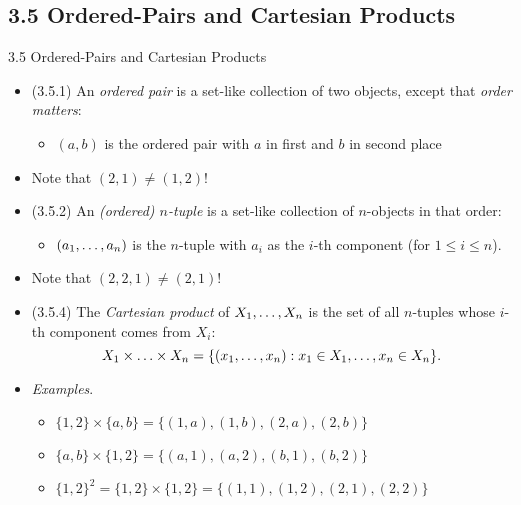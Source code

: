 \subsection{3.5 Ordered-Pairs and Cartesian Products}
\begin{frame}{3.5 Ordered-Pairs and Cartesian Products}

	\begin{itemize}
	
		\item (3.5.1) An \emph{ordered pair} is a set-like collection of two objects, except that \emph{order matters}:
		
			\begin{itemize}
			
				\item $(a,b)$ is the ordered pair with $a$ in first and $b$ in second place
			
			\end{itemize}
			
		\item Note that $(2,1)\neq (1,2)$!
			
		\item (3.5.2) An \emph{(ordered) $n$-tuple} is a set-like collection of $n$-objects in that order:
		
		\begin{itemize}
		
			\item $(a_1, \mathellipsis, a_n)$ is the $n$-tuple with $a_i$ as the $i$-th component (for $1\leq i\leq n$).
		
		\end{itemize}
		
		\item Note that $(2,2,1)\neq (2,1)$!
		
		\item (3.5.4) The \emph{Cartesian product} of $X_1, \mathellipsis, X_n$ is the set of all $n$-tuples whose $i$-th component comes from $X_i$: \[X_1\times \mathellipsis\times X_n=\{(x_1, \mathellipsis, x_n):x_1\in X_1, \mathellipsis, x_n\in X_n\}.\]

		
		\item \emph{Examples}. 
		
		\begin{itemize}
		
			\item $\{1,2\}\times \{a,b\}=\{(1,a), (1,b), (2,a), (2,b)\}$
			
			\item $\{a,b\}\times \{1,2\}=\{(a,1), (a,2), (b,1), (b,2)\}$
			
			\item $\{1,2\}^2=\{1,2\}\times\{1,2\}=\{(1,1), (1,2), (2,1), (2,2)\}$
		
		\end{itemize}

	
	\end{itemize}

\end{frame}

